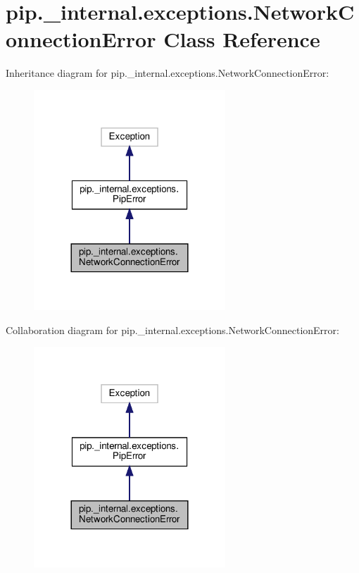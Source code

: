 \hypertarget{classpip_1_1__internal_1_1exceptions_1_1NetworkConnectionError}{}\section{pip.\+\_\+internal.\+exceptions.\+Network\+Connection\+Error Class Reference}
\label{classpip_1_1__internal_1_1exceptions_1_1NetworkConnectionError}


Inheritance diagram for pip.\+\_\+internal.\+exceptions.\+Network\+Connection\+Error\+:
\nopagebreak
\begin{figure}[H]
\begin{center}
\leavevmode
\includegraphics[width=204pt]{classpip_1_1__internal_1_1exceptions_1_1NetworkConnectionError__inherit__graph}
\end{center}
\end{figure}


Collaboration diagram for pip.\+\_\+internal.\+exceptions.\+Network\+Connection\+Error\+:
\nopagebreak
\begin{figure}[H]
\begin{center}
\leavevmode
\includegraphics[width=204pt]{classpip_1_1__internal_1_1exceptions_1_1NetworkConnectionError__coll__graph}
\end{center}
\end{figure}
